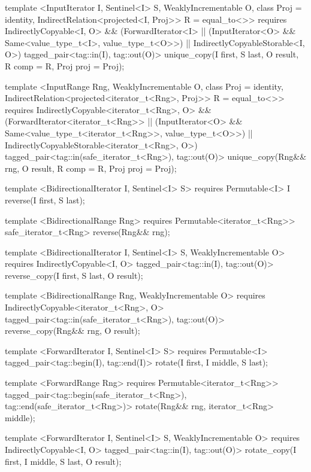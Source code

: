 {\begin{codeblock}
{{    template <InputIterator I, Sentinel<I> S, WeaklyIncrementable O,
        class Proj = identity, IndirectRelation<projected<I, Proj>> R = equal_to<>>
      requires IndirectlyCopyable<I, O> &&
        (ForwardIterator<I> ||
        (InputIterator<O> && Same<value_type_t<I>, value_type_t<O>>) ||
        IndirectlyCopyableStorable<I, O>)
      tagged_pair<tag::in(I), tag::out(O)>
        unique_copy(I first, S last, O result, R comp = R{}, Proj proj = Proj{});

    template <InputRange Rng, WeaklyIncrementable O, class Proj = identity,
        IndirectRelation<projected<iterator_t<Rng>, Proj>> R = equal_to<>>
      requires IndirectlyCopyable<iterator_t<Rng>, O> &&
        (ForwardIterator<iterator_t<Rng>> ||
        (InputIterator<O> && Same<value_type_t<iterator_t<Rng>>, value_type_t<O>>) ||
        IndirectlyCopyableStorable<iterator_t<Rng>, O>)
      tagged_pair<tag::in(safe_iterator_t<Rng>), tag::out(O)>
        unique_copy(Rng&& rng, O result, R comp = R{}, Proj proj = Proj{});

    template <BidirectionalIterator I, Sentinel<I> S>
      requires Permutable<I>
      I reverse(I first, S last);

    template <BidirectionalRange Rng>
      requires Permutable<iterator_t<Rng>>
      safe_iterator_t<Rng>
        reverse(Rng&& rng);

    template <BidirectionalIterator I, Sentinel<I> S, WeaklyIncrementable O>
      requires IndirectlyCopyable<I, O>
      tagged_pair<tag::in(I), tag::out(O)> reverse_copy(I first, S last, O result);

    template <BidirectionalRange Rng, WeaklyIncrementable O>
      requires IndirectlyCopyable<iterator_t<Rng>, O>
      tagged_pair<tag::in(safe_iterator_t<Rng>), tag::out(O)>
        reverse_copy(Rng&& rng, O result);

    template <ForwardIterator I, Sentinel<I> S>
      requires Permutable<I>
      tagged_pair<tag::begin(I), tag::end(I)>
        rotate(I first, I middle, S last);

    template <ForwardRange Rng>
      requires Permutable<iterator_t<Rng>>
      tagged_pair<tag::begin(safe_iterator_t<Rng>),
                  tag::end(safe_iterator_t<Rng>)>
        rotate(Rng&& rng, iterator_t<Rng> middle);

    template <ForwardIterator I, Sentinel<I> S, WeaklyIncrementable O>
      requires IndirectlyCopyable<I, O>
      tagged_pair<tag::in(I), tag::out(O)>
        rotate_copy(I first, I middle, S last, O result);

}}
\end{codeblock}}
